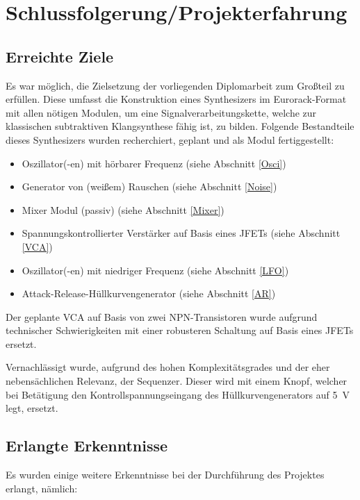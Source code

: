 \chapter*{Schlussfolgerung/Projekterfahrung}

\section*{Erreichte Ziele \label{goals}}
\label{sec:org79bbcf0}
Es war möglich, die Zielsetzung der vorliegenden Diplomarbeit zum Großteil zu erfüllen. Diese umfasst die Konstruktion eines Synthesizers im Eurorack-Format mit allen nötigen Modulen, um eine Signalverarbeitungskette, welche zur klassischen subtraktiven Klangsynthese fähig ist, zu bilden. Folgende Bestandteile dieses Synthesizers wurden recherchiert, geplant und als Modul fertiggestellt:

\begin{itemize}
\item Oszillator(-en) mit hörbarer Frequenz (siehe Abschnitt \ref{Osci})
\item Generator von (weißem) Rauschen (siehe Abschnitt \ref{Noise})
\item Mixer Modul (passiv) (siehe Abschnitt \ref{Mixer})
\item Spannungskontrollierter Verstärker auf Basis eines JFETs (siehe Abschnitt \ref{VCA})
\item Oszillator(-en) mit niedriger Frequenz (siehe Abschnitt \ref{LFO})
\item Attack-Release-Hüllkurvengenerator (siehe Abschnitt \ref{AR})
\end{itemize}

Der geplante \ac{VCA} auf Basis von zwei NPN-Transistoren wurde aufgrund technischer Schwierigkeiten mit einer robusteren Schaltung auf Basis eines JFETs ersetzt.

Vernachlässigt wurde, aufgrund des hohen Komplexitätsgrades und der eher nebensächlichen Relevanz, der Sequenzer. Dieser wird mit einem Knopf, welcher bei Betätigung den Kontrollspannungseingang des Hüllkurvengenerators auf \SI{5}{\volt} legt, ersetzt.

\section*{Erlangte Erkenntnisse}
\label{sec:org659470e}
Es wurden einige weitere Erkenntnisse bei der Durchführung des Projektes erlangt, nämlich:

